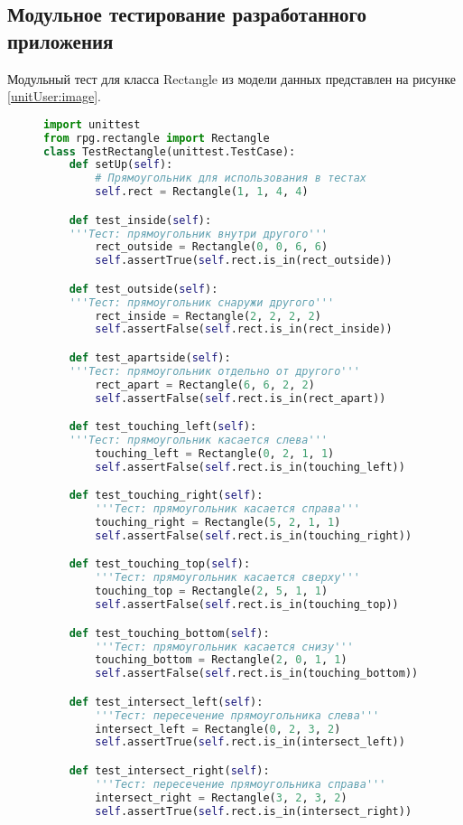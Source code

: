 \subsection{Модульное тестирование разработанного приложения}

Модульный тест для класса Rectangle из модели данных представлен на рисунке \ref{unitUser:image}.

\begin{figure}[H]
\begin{lstlisting}[language=Python]
import unittest
from rpg.rectangle import Rectangle
class TestRectangle(unittest.TestCase):
	def setUp(self):
		# Прямоугольник для использования в тестах
		self.rect = Rectangle(1, 1, 4, 4)

	def test_inside(self):
	'''Тест: прямоугольник внутри другого'''
		rect_outside = Rectangle(0, 0, 6, 6)
		self.assertTrue(self.rect.is_in(rect_outside))

	def test_outside(self):
	'''Тест: прямоугольник снаружи другого'''
		rect_inside = Rectangle(2, 2, 2, 2)
		self.assertFalse(self.rect.is_in(rect_inside))

	def test_apartside(self):
	'''Тест: прямоугольник отдельно от другого'''
		rect_apart = Rectangle(6, 6, 2, 2)
		self.assertFalse(self.rect.is_in(rect_apart))

	def test_touching_left(self):
	'''Тест: прямоугольник касается слева'''
		touching_left = Rectangle(0, 2, 1, 1)
		self.assertFalse(self.rect.is_in(touching_left))

	def test_touching_right(self):
		'''Тест: прямоугольник касается справа'''
		touching_right = Rectangle(5, 2, 1, 1)
		self.assertFalse(self.rect.is_in(touching_right))

	def test_touching_top(self):
		'''Тест: прямоугольник касается сверху'''
		touching_top = Rectangle(2, 5, 1, 1)
		self.assertFalse(self.rect.is_in(touching_top))

	def test_touching_bottom(self):
		'''Тест: прямоугольник касается снизу'''
		touching_bottom = Rectangle(2, 0, 1, 1)
		self.assertFalse(self.rect.is_in(touching_bottom))

	def test_intersect_left(self):
		'''Тест: пересечение прямоугольника слева'''
		intersect_left = Rectangle(0, 2, 3, 2)
		self.assertTrue(self.rect.is_in(intersect_left))

	def test_intersect_right(self):
		'''Тест: пересечение прямоугольника справа'''
		intersect_right = Rectangle(3, 2, 3, 2)
		self.assertTrue(self.rect.is_in(intersect_right))


\end{lstlisting}
\end{figure}
